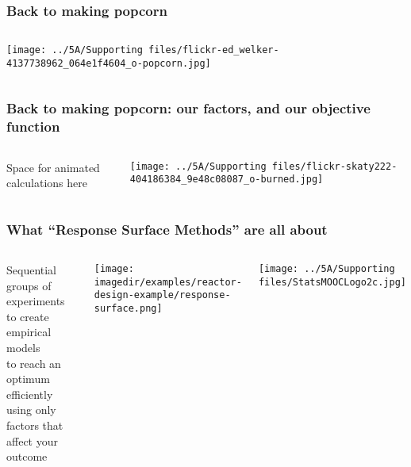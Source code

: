 \begin{frame}\frametitle{Back to making popcorn}
	\begin{columns}[T]
			\texttt{[image: ../5A/Supporting files/flickr-ed\_welker-4137738962\_064e1f4604\_o-popcorn.jpg]}

			
			\vspace{5cm}
	\end{columns}
	
\end{frame}

\begin{frame}\frametitle{Back to making popcorn: our factors, and our objective function}
	\begin{columns}[T]
			\vspace{6cm}
			{\tiny Space for animated calculations here}

			\texttt{[image: ../5A/Supporting files/flickr-skaty222-404186384\_9e48c08087\_o-burned.jpg]}
			
			
	\end{columns}
	
\end{frame}

\begin{frame}\frametitle{What ``Response Surface Methods'' are all about}
	
	\begin{columns}[c]
			\begin{exampleblock}{}
				Sequential groups of experiments\\
				to create empirical models\\
				to reach an optimum\\
				efficiently\\
				using only factors that affect your outcome
			\end{exampleblock}
	
			\texttt{[image: \\imagedir/examples/reactor-design-example/response-surface.png]}
			
			\texttt{[image: ../5A/Supporting files/StatsMOOCLogo2c.jpg]}
	\end{columns}
	
\end{frame}



